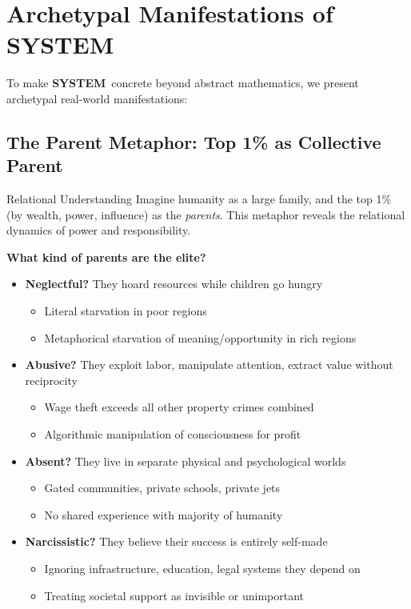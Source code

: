 \documentclass[11pt,a4paper]{article}
\newcommand{\SYSTEM}{\textbf{SYSTEM}}
\theoremstyle{definition}
\theoremstyle{remark}
\begin{document}
\section{Archetypal Manifestations of SYSTEM}
\label{app:archetypes}

To make \SYSTEM\ concrete beyond abstract mathematics, we present archetypal real-world manifestations:

\subsection{The Parent Metaphor: Top 1\% as Collective Parent}

\begin{keyinsight}{Relational Understanding}
Imagine humanity as a large family, and the top 1\% (by wealth, power, influence) as the \textit{parents}. This metaphor reveals the relational dynamics of power and responsibility.
\end{keyinsight}

\textbf{What kind of parents are the elite?}

\begin{itemize}[leftmargin=1.5em]
    \item \textbf{Neglectful?} They hoard resources while children go hungry
    \begin{itemize}
        \item Literal starvation in poor regions
        \item Metaphorical starvation of meaning/opportunity in rich regions
    \end{itemize}
    
    \item \textbf{Abusive?} They exploit labor, manipulate attention, extract value without reciprocity
    \begin{itemize}
        \item Wage theft exceeds all other property crimes combined
        \item Algorithmic manipulation of consciousness for profit
    \end{itemize}
    
    \item \textbf{Absent?} They live in separate physical and psychological worlds
    \begin{itemize}
        \item Gated communities, private schools, private jets
        \item No shared experience with majority of humanity
    \end{itemize}
    
    \item \textbf{Narcissistic?} They believe their success is entirely self-made
    \begin{itemize}
        \item Ignoring infrastructure, education, legal systems they depend on
        \item Treating societal support as invisible or unimportant
    \end{itemize}
\end{itemize}
\end{document}
